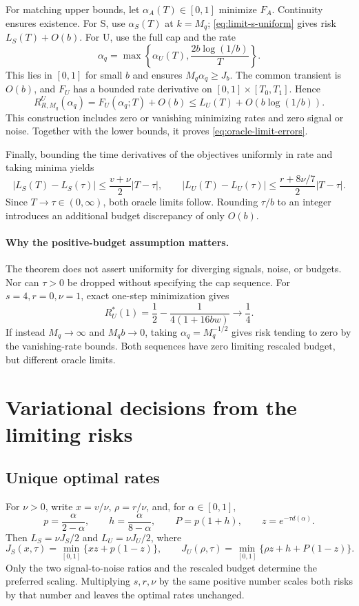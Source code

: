 For matching upper bounds, let $\alpha_A(T)\in[0,1]$ minimize $F_A$.
Continuity ensures existence. For S, use $\alpha_S(T)$ at $k=M_q$;
\cref{eq:limit-s-uniform} gives risk $L_S(T)+O(b)$. For U, use the full cap
and the rate
\[
  \alpha_q=\max\left\{\alpha_U(T),\frac{2b\log(1/b)}{T}\right\}.
\]
This lies in $[0,1]$ for small $b$ and ensures $M_q\alpha_q\geq J_b$.
The common transient is $O(b)$, and $F_U$ has a bounded rate derivative on
$[0,1]\times[T_0,T_1]$. Hence
\[
  R^U_{R,M_q}(\alpha_q)=F_U(\alpha_q;T)+O(b)
    \leq L_U(T)+O(b\log(1/b)).
\]
This construction includes zero or vanishing minimizing rates and zero signal
or noise. Together with the lower bounds, it proves
\cref{eq:oracle-limit-errors}.

Finally, bounding the time derivatives of the objectives uniformly in rate and
taking minima yields
\[
  |L_S(T)-L_S(\tau)|\leq\frac{v+\nu}{2}|T-\tau|,\qquad
  |L_U(T)-L_U(\tau)|\leq\frac{r+8\nu/7}{2}|T-\tau|.
\]
Since $T\to\tau\in(0,\infty)$, both oracle limits follow. Rounding $\tau/b$
to an integer introduces an additional budget discrepancy of only $O(b)$.

\paragraph{Why the positive-budget assumption matters.}

The theorem does not assert uniformity for diverging signals, noise, or budgets.
Nor can $\tau>0$ be dropped without specifying the cap sequence. For
$s=4,r=0,\nu=1$, exact one-step minimization gives
\[
  R_U^*(1)=\frac12-\frac{1}{4(1+16bw)}\longrightarrow\frac14.
\]
If instead $M_q\to\infty$ and $M_qb\to0$, taking
$\alpha_q=M_q^{-1/2}$ gives risk tending to zero by the vanishing-rate bounds.
Both sequences have zero limiting rescaled budget, but different oracle limits.

\section{Variational decisions from the limiting risks}
\label{sec:oracle-variational}

\subsection{Unique optimal rates}

For $\nu>0$, write $x=v/\nu$, $\rho=r/\nu$, and, for $\alpha\in[0,1]$,
\[
  p=\frac{\alpha}{2-\alpha},\qquad
  h=\frac{\alpha}{8-\alpha},\qquad P=p(1+h),\qquad z=e^{-\tau d(\alpha)}.
\]
Then $L_S=\nu J_S/2$ and $L_U=\nu J_U/2$, where
\begin{equation}
  J_S(x,\tau)=\min_{[0,1]}\{xz+p(1-z)\},\qquad
  J_U(\rho,\tau)=\min_{[0,1]}\{\rho z+h+P(1-z)\}.
  \label{eq:dimensionless-oracles}
\end{equation}
Only the two signal-to-noise ratios and the rescaled budget determine the
preferred scaling. Multiplying $s,r,\nu$ by the same positive number scales
both risks by that number and leaves the optimal rates unchanged.

